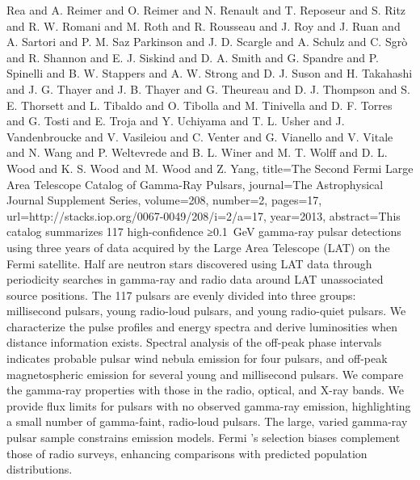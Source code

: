 {{{Rea and A. Reimer and O. Reimer and N. Renault and T. Reposeur and S. Ritz and R. W. Romani and M. Roth and R. Rousseau and J. Roy and J.
Ruan and A. Sartori and P. M. Saz Parkinson and J. D. Scargle and A. Schulz and C. Sgrò and R. Shannon and E. J. Siskind and D. A.
Smith and G. Spandre and P. Spinelli and B. W. Stappers and A. W. Strong and D. J. Suson and H. Takahashi and J. G. Thayer and J. B.
Thayer and G. Theureau and D. J. Thompson and S. E. Thorsett and L. Tibaldo and O. Tibolla and M. Tinivella and D. F. Torres and G.
Tosti and E. Troja and Y. Uchiyama and T. L. Usher and J. Vandenbroucke and V. Vasileiou and C. Venter and G. Vianello and V.
Vitale and N. Wang and P. Weltevrede and B. L. Winer and M. T. Wolff and D. L. Wood and K. S. Wood and M. Wood and Z. Yang},
  title={The Second Fermi Large Area Telescope Catalog of Gamma-Ray Pulsars},
  journal={The Astrophysical Journal Supplement Series},
  volume={208},
  number={2},
  pages={17},
  url={http://stacks.iop.org/0067-0049/208/i=2/a=17},
  year={2013},
  abstract={This catalog summarizes 117 high-confidence ≥0.1 GeV gamma-ray pulsar detections using three years of data acquired by the Large Area Telescope (LAT) on the Fermi satellite. Half are neutron stars discovered using LAT data through periodicity searches in gamma-ray and radio data around LAT unassociated source positions. The 117 pulsars are evenly divided into three groups: millisecond pulsars, young radio-loud pulsars, and young radio-quiet pulsars. We characterize the pulse profiles and energy spectra and derive luminosities when distance information exists. Spectral analysis of the off-peak phase intervals indicates probable pulsar wind nebula emission for four pulsars, and off-peak magnetospheric emission for several young and millisecond pulsars. We compare the gamma-ray properties with those in the radio, optical, and X-ray bands. We provide flux limits for pulsars with no observed gamma-ray emission, highlighting a small number of gamma-faint, radio-loud pulsars. The large, varied gamma-ray pulsar sample constrains emission models. Fermi 's selection biases complement those of radio surveys, enhancing comparisons with predicted population distributions.}
}

}
